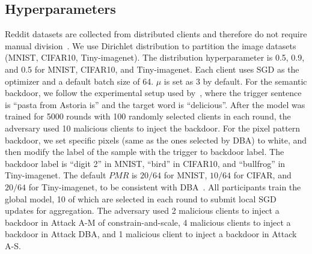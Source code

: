 \subsection{Hyperparameters}
Reddit datasets are collected from distributed clients and therefore do not require manual division~\cite{howtobackdoor}. We use Dirichlet distribution to partition the image datasets (MNIST, CIFAR10, Tiny-imagenet). The distribution hyperparameter is 0.5, 0.9, and 0.5 for MNIST, CIFAR10, and Tiny-imagenet. Each client uses SGD as the optimizer and a default batch size of 64. $\mu $ is set as 3 by default.
For the semantic backdoor, we follow the experimental setup used by~\cite{howtobackdoor}, where the trigger sentence is ``pasta from Astoria is'' and the target word is ``delicious''. After the model was trained for 5000 rounds with 100 randomly selected clients in each round, the adversary used 10 malicious clients to inject the backdoor.
For the pixel pattern backdoor, we set specific pixels (same as the ones selected by DBA) to white, and then modify the label of the sample with the trigger to backdoor label. The backdoor label is ``digit 2'' in MNIST, ``bird'' in CIFAR10, and ``bullfrog'' in Tiny-imagenet. The default $PMR$ is $20/64$ for MNIST, $10/64$ for CIFAR, and $20/64$ for Tiny-imagenet, to be consistent with DBA~\cite{xie2020dba}. All participants train the global model, 10 of which are selected in each round to submit local SGD updates for aggregation. The adversary used 2 malicious clients to inject a backdoor in  Attack A-M of constrain-and-scale, 4 malicious clients to inject a backdoor in Attack DBA, and 1 malicious client to inject a backdoor in  Attack A-S.

